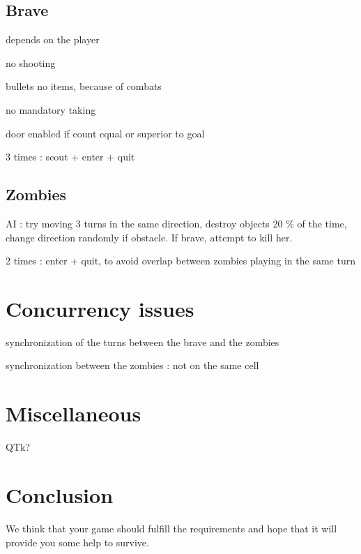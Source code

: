 \documentclass[11pt,a4paper]{article}
\begin{document}
\subsection{Brave}
depends on the player

no shooting

bullets no items, because of combats

no mandatory taking

door enabled if count equal or superior to goal

3 times : scout + enter + quit

\subsection{Zombies}
AI : try moving 3 turns in the same direction, destroy objects 20 \% of the time, change direction randomly if obstacle. If brave, attempt to kill her.

2 times : enter + quit, to avoid overlap between zombies playing in the same turn


\section{Concurrency issues}
synchronization of the turns between the brave and the zombies

synchronization between the zombies : not on the same cell


\section{Miscellaneous}
QTk?

    
\section*{Conclusion}
We think that your game should fulfill the requirements and hope that it will provide you some help to survive.
    
\end{document}

